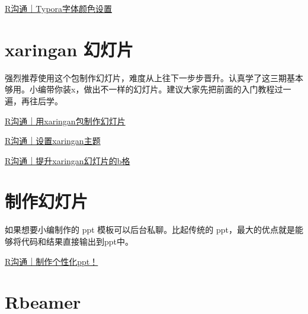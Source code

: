 \documentclass[
]{book}
\begin{document}
\href{http://mp.weixin.qq.com/s?__biz=MzI1NjUwMjQxMQ==\&mid=2247494584\&idx=1\&sn=bd9537620ad7c8895a37c10ba788a97c\&chksm=ea27145cdd509d4acf4bbe867e4e50c6a995f57f70626c3798dab478dbd37f4f6c2a4247a312\&scene=21\#wechat_redirect}{R沟通｜Typora字体颜色设置}

\hypertarget{xaringan-ux5e7bux706fux7247}{%
\section{xaringan 幻灯片}\label{xaringan-ux5e7bux706fux7247}}

强烈推荐使用这个包制作幻灯片，难度从上往下一步步晋升。认真学了这三期基本够用。小编带你装x，做出不一样的幻灯片。建议大家先把前面的入门教程过一遍，再往后学。

\href{http://mp.weixin.qq.com/s?__biz=MzI1NjUwMjQxMQ==\&mid=2247489685\&idx=1\&sn=aa5bccb2afe9c3882d415e4ed17c5b48\&chksm=ea24e771dd536e6788cf8689009c469150998b58d4673c0453876f9c3b9854dbae385af33a2b\&scene=21\#wechat_redirect}{R沟通｜用xaringan包制作幻灯片}

\href{http://mp.weixin.qq.com/s?__biz=MzI1NjUwMjQxMQ==\&mid=2247489789\&idx=1\&sn=94e8b76d45743e85db57a2b0ef417fcf\&chksm=ea24e719dd536e0fbec0d3ed94d4104f65e219ebd86f5a45a30d2ff2084cf5b0bddfe079852f\&scene=21\#wechat_redirect}{R沟通｜设置xaringan主题}

\href{http://mp.weixin.qq.com/s?__biz=MzI1NjUwMjQxMQ==\&mid=2247495986\&idx=1\&sn=c0e47f57ddb341e581af7e96e8370e4a\&chksm=ea270ed6dd5087c0c97adfad45988ae2ff53ff9519515e7fa503d9931d02f7268a572acf5a02\&scene=21\#wechat_redirect}{R沟通｜提升xaringan幻灯片的b格}

\hypertarget{ux5236ux4f5cux5e7bux706fux7247}{%
\section{制作幻灯片}\label{ux5236ux4f5cux5e7bux706fux7247}}

如果想要小编制作的 ppt 模板可以后台私聊。比起传统的 ppt，最大的优点就是能够将代码和结果直接输出到ppt中。

\href{http://mp.weixin.qq.com/s?__biz=MzI1NjUwMjQxMQ==\&mid=2247488738\&idx=1\&sn=b0d21bfe77d3c7c65d0c8df72c1694d0\&chksm=ea24eb06dd536210b1d1ed44d2dcb5214d106a787ace6b437549a450a83300e84b052c595a5b\&scene=21\#wechat_redirect}{R沟通｜制作个性化ppt！}

\hypertarget{rbeamer}{%
\section{Rbeamer}\label{rbeamer}}
\end{document}

